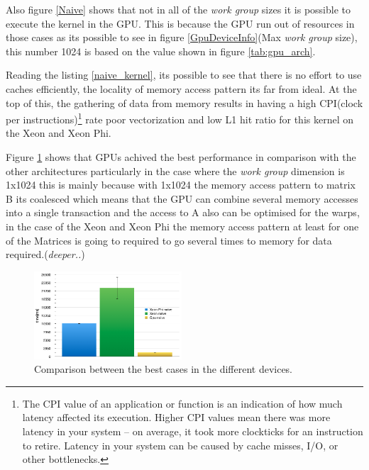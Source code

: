 \par{Also figure \ref{Naive} shows that not in all of the \emph{work group} sizes it is possible to execute the kernel in the GPU. 
This is because the GPU run out of resources in those cases\cite{opencl_error} as its possible to see in figure 
\ref{GpuDeviceInfo}(Max \emph{work group} size), this number 1024 is based on the value shown in figure \ref{tab:gpu_arch}.}

\par{Reading the listing \ref{naive_kernel}, its possible to see that there is no effort to use caches efficiently, the locality of
    memory access pattern its far from ideal. At the top of this, the gathering of data from memory results in having a high CPI(clock per
    instructions)\footnote{The CPI value of an application or function is an indication of how much latency affected its execution. 
    Higher CPI values mean there was more latency in your system – on average, it took more clockticks for an instruction to retire. 
    Latency in your system can be caused by cache misses, I/O, or other bottlenecks\cite{cpi}.} 
    rate poor vectorization and low L1 hit ratio for this kernel on the Xeon and Xeon Phi.}

\par{Figure \ref{NaiveRes} shows that GPUs achived the best performance in comparison with the other architectures particularly
    in the case where the \emph{work group} dimension is 1x1024 this is mainly because with 1x1024 the memory access pattern to 
    matrix B its coalesced which means that the GPU can combine several memory accesses into a single transaction and the access to 
    A also can be optimised for the warps, in the case of the Xeon and Xeon Phi the memory access pattern at least for one of the 
    Matrices is going to required to go several times to memory for data required.(\emph{deeper..})}


\begin{figure}[!h]
    \centering
    \includegraphics[width=0.49\textwidth]{figures/naiveRes.png}
    \caption{Comparison between the best cases in the different devices.}
    \label{NaiveRes}
\end{figure}



